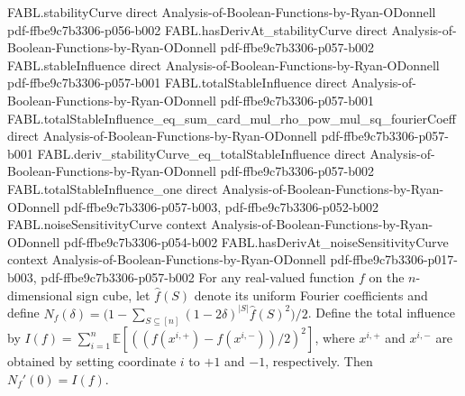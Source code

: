 \begin{theorem}
\proofstep
  {FABL.stabilityCurve}
  {direct}
  {Analysis-of-Boolean-Functions-by-Ryan-ODonnell}
  {pdf-ffbe9c7b3306-p056-b002}
\proofstep
  {FABL.hasDerivAt_stabilityCurve}
  {direct}
  {Analysis-of-Boolean-Functions-by-Ryan-ODonnell}
  {pdf-ffbe9c7b3306-p057-b002}
\proofstep
  {FABL.stableInfluence}
  {direct}
  {Analysis-of-Boolean-Functions-by-Ryan-ODonnell}
  {pdf-ffbe9c7b3306-p057-b001}
\proofstep
  {FABL.totalStableInfluence}
  {direct}
  {Analysis-of-Boolean-Functions-by-Ryan-ODonnell}
  {pdf-ffbe9c7b3306-p057-b001}
\proofstep
  {FABL.totalStableInfluence_eq_sum_card_mul_rho_pow_mul_sq_fourierCoeff}
  {direct}
  {Analysis-of-Boolean-Functions-by-Ryan-ODonnell}
  {pdf-ffbe9c7b3306-p057-b001}
\proofstep
  {FABL.deriv_stabilityCurve_eq_totalStableInfluence}
  {direct}
  {Analysis-of-Boolean-Functions-by-Ryan-ODonnell}
  {pdf-ffbe9c7b3306-p057-b002}
\proofstep
  {FABL.totalStableInfluence_one}
  {direct}
  {Analysis-of-Boolean-Functions-by-Ryan-ODonnell}
  {pdf-ffbe9c7b3306-p057-b003,
    pdf-ffbe9c7b3306-p052-b002}
\proofstep
  {FABL.noiseSensitivityCurve}
  {context}
  {Analysis-of-Boolean-Functions-by-Ryan-ODonnell}
  {pdf-ffbe9c7b3306-p054-b002}
\proofstep
  {FABL.hasDerivAt_noiseSensitivityCurve}
  {context}
  {Analysis-of-Boolean-Functions-by-Ryan-ODonnell}
  {pdf-ffbe9c7b3306-p017-b003,
    pdf-ffbe9c7b3306-p057-b002}
For any real-valued function $f$ on the $n$-dimensional sign cube, let $\widehat f(S)$
denote its uniform Fourier coefficients and define
$N_f(\delta)=\bigl(1-\sum_{S\subseteq[n]}(1-2\delta)^{|S|}\widehat f(S)^2\bigr)/2$.
Define the total influence by
$I(f)=\sum_{i=1}^n\mathbb{E}[((f(x^{i,+})-f(x^{i,-}))/2)^2]$, where $x^{i,+}$ and
$x^{i,-}$ are obtained by setting coordinate $i$ to $+1$ and $-1$, respectively. Then
$N_f'(0)=I(f)$.
\end{theorem}

